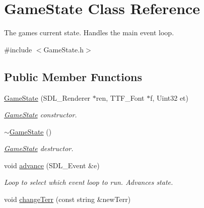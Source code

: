 \hypertarget{class_game_state}{}\section{Game\+State Class Reference}
\label{class_game_state}


The game\textquotesingle{}s current state. Handles the main event loop.  




{\ttfamily \#include $<$Game\+State.\+h$>$}

\subsection*{Public Member Functions}
\begin{DoxyCompactItemize}
\item 
\hyperlink{class_game_state_acef60be8af72e98d8e6cffb50616e272}{Game\+State} (S\+D\+L\+\_\+\+Renderer $\ast$ren, T\+T\+F\+\_\+\+Font $\ast$f, Uint32 et)\hypertarget{class_game_state_acef60be8af72e98d8e6cffb50616e272}{}\label{class_game_state_acef60be8af72e98d8e6cffb50616e272}

\begin{DoxyCompactList}\small\item\em \hyperlink{class_game_state}{Game\+State} constructor. \end{DoxyCompactList}\item 
\hyperlink{class_game_state_ae623df5042cd0c17daa3394fdcb397b3}{$\sim$\+Game\+State} ()\hypertarget{class_game_state_ae623df5042cd0c17daa3394fdcb397b3}{}\label{class_game_state_ae623df5042cd0c17daa3394fdcb397b3}

\begin{DoxyCompactList}\small\item\em \hyperlink{class_game_state}{Game\+State} destructor. \end{DoxyCompactList}\item 
void \hyperlink{class_game_state_a6635a5af1ea4211afcfec058445ff933}{advance} (S\+D\+L\+\_\+\+Event \&e)\hypertarget{class_game_state_a6635a5af1ea4211afcfec058445ff933}{}\label{class_game_state_a6635a5af1ea4211afcfec058445ff933}

\begin{DoxyCompactList}\small\item\em Loop to select which event loop to run. Advances state. \end{DoxyCompactList}\item 
void \hyperlink{class_game_state_ab3c0c9f3f38b875735cfe39ce6a2c154}{change\+Terr} (const string \&new\+Terr)\hypertarget{class_game_state_ab3c0c9f3f38b875735cfe39ce6a2c154}{}\label{class_game_state_ab3c0c9f3f38b875735cfe39ce6a2c154}


\end{DoxyCompactItemize}
